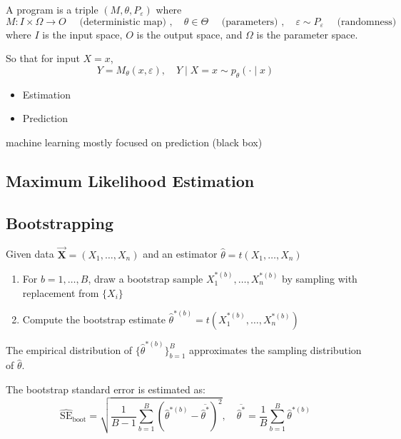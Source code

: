 \documentclass[10pt, headings=standardclasses, parskip=half, twoside]{scrartcl}
\newcommand{\vect}[1]{\vec{\boldsymbol{#1}}}
\begin{document}
\begin{definition}[Program]\label{def:program}
A program is a triple $\left(M, \theta, P_{\varepsilon}\right)$ where
$$
M: I \times \Omega \rightarrow O \quad \text { (deterministic map) }, \quad \theta \in \Theta \quad \text { (parameters) }, \quad \varepsilon \sim P_{\varepsilon} \quad \text { (randomness) }
$$
where $I$ is the input space, $O$ is the output space, and $\Omega$ is the parameter space.

So that for input $X=x$,
$$
Y=M_\theta(x, \varepsilon), \quad Y \mid X=x \sim p_\theta(\cdot \mid x)
$$
\end{definition}


\begin{itemize}
\item Estimation
\item Prediction
\end{itemize}
machine learning mostly focused on prediction (black box)



\subsection{Maximum Likelihood Estimation}\label{subsec:MLE}



\subsection{Bootstrapping}\label{subsec:bootstrapping}
\begin{definition}[Bootstrap]\label{def:bootstrap}
  Given data \(\vect{X} = (X_1, \ldots, X_n)\) and an estimator \(\hat{\theta} = t (X_1, \ldots, X_n)\)
  \begin{enumerate}
  \item For \(b=1,\ldots,B\), draw a bootstrap sample \(X_1^{*(b)}, \ldots, X_n^{*(b)}\) by sampling with replacement from \(\{X_i\}\)
  \item Compute the bootstrap estimate \(\hat{\theta}^{*(b)} = t(X_1^{*(b)}, \ldots, X_n^{*(b)})\)
  \end{enumerate}
The empirical distribution of \(\{\hat{\theta}^{*(b)}\}^B_{b=1}\) approximates the sampling distribution of \(\hat{\theta}\).
\end{definition}

The bootstrap standard error is estimated as:
$$
\widehat{\mathrm{SE}}_{\mathrm{boot}}=\sqrt{\frac{1}{B-1} \sum_{b=1}^B\left(\hat{\theta}^{*(b)}-\overline{\hat{\theta}^*}\right)^2}, \quad \overline{\hat{\theta}^*}=\frac{1}{B} \sum_{b=1}^B \hat{\theta}^{*(b)}
$$
\end{document}
